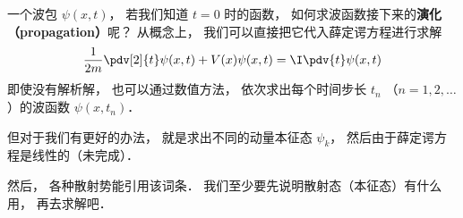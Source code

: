 
一个波包 $\psi(x, t)$， 若我们知道 $t = 0$ 时的函数， 如何求波函数接下来的\textbf{演化（propagation）}呢？ 从概念上， 我们可以直接把它代入薛定谔方程进行求解
\begin{equation}
\frac{1}{2m}\pdv[2]{t}\psi(x, t) + V(x) \psi(x, t) = \I \pdv{t} \psi(x, t)
\end{equation}
即使没有解析解， 也可以通过数值方法， 依次求出每个时间步长 $t_n$ （$n = 1, 2, \dots$）的波函数 $\psi(x, t_n)$． %

但对于我们有更好的办法， 就是求出不同的动量本征态 $\psi_k$， 然后由于薛定谔方程是线性的（未完成）．

然后， 各种散射势能引用该词条． 我们至少要先说明散射态（本征态）有什么用， 再去求解吧．
